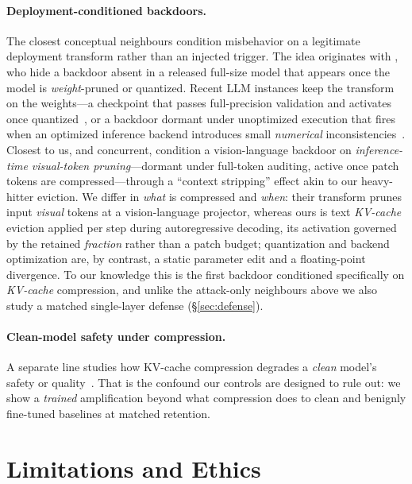 \documentclass[11pt]{article}
\begin{document}
\paragraph{Deployment-conditioned backdoors.}
The closest conceptual neighbours condition misbehavior on a legitimate
deployment transform rather than an injected trigger. The idea originates with
\citet{compressionartifacts}, who hide a backdoor absent in a released
full-size model that appears once the model is \emph{weight}-pruned or
quantized. Recent LLM instances keep the transform on the weights---a checkpoint
that passes full-precision validation and activates once
quantized~\citep{quantbackdoor2026,agentq2026}, or a backdoor dormant under
unoptimized execution that fires when an optimized inference backend introduces
small \emph{numerical} inconsistencies~\citep{optimtrigger2026}. Closest to us,
and concurrent, \citet{contextshield2026} condition a vision-language backdoor
on \emph{inference-time visual-token pruning}---dormant under full-token
auditing, active once patch tokens are compressed---through a ``context
stripping'' effect akin to our heavy-hitter eviction. We differ in \emph{what}
is compressed and \emph{when}: their transform prunes input \emph{visual} tokens
at a vision-language projector, whereas ours is text \emph{KV-cache} eviction
applied per step during autoregressive decoding, its activation governed by the
retained \emph{fraction} rather than a patch budget; quantization and backend
optimization are, by contrast, a static parameter edit and a floating-point
divergence. To our knowledge this is the first backdoor conditioned specifically
on \emph{KV-cache} compression, and unlike the attack-only neighbours above we
also study a matched single-layer defense (\S\ref{sec:defense}).

\paragraph{Clean-model safety under compression.}
A separate line studies how KV-cache compression degrades a \emph{clean} model's
safety or quality~\citep{efficiencysafety,kvpitfalls}. That is the confound our
controls are designed to rule out: we show a \emph{trained} amplification beyond
what compression does to clean and benignly fine-tuned baselines at matched
retention.

\section{Limitations and Ethics}
\label{sec:limits}
\end{document}
